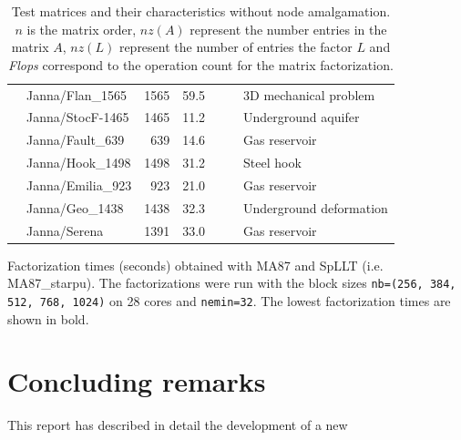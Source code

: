 \documentclass{article}
\begin{document}
\begin{table}[htbp]
\begin{center}
{\begin{tabular}{rl|rrrrl}
         & Janna/Flan\_1565                & 1565     & 59.5     &          &          & 3D mechanical problem    \\
         & Janna/StocF-1465                & 1465     & 11.2     &          &          & Underground aquifer      \\
         & Janna/Fault\_639                & 639      & 14.6     &          &          & Gas reservoir            \\
         & Janna/Hook\_1498                & 1498     & 31.2     &          &          & Steel hook               \\
         & Janna/Emilia\_923               & 923      & 21.0     &          &          & Gas reservoir            \\
         & Janna/Geo\_1438                 & 1438     & 32.3     &          &          & Underground deformation  \\
         & Janna/Serena                    & 1391     & 33.0     &          &          & Gas reservoir            \\
      \hline
    \end{tabular}}
  \end{center}
  \caption{Test matrices and their characteristics without node
    amalgamation. $n$ is the matrix order, $nz(A)$ represent the
    number entries in the matrix $A$, $nz(L)$ represent the number of
    entries the factor $L$ and \textit{Flops} correspond to the operation
    count for the matrix factorization.}
\end{table}


\begin{table}[htbp]
    \begin{center}
      
    \end{center}
    \caption{Factorization times (seconds) obtained with MA87 and
      SpLLT (i.e. MA87\_starpu). The factorizations were run with the
      block sizes \texttt{nb=(256, 384, 512, 768, 1024)} on 28 cores
      and \texttt{nemin=32}. The lowest factorization times are shown
      in bold.}
\end{table}

\section{Concluding remarks}\label{sec:conclusions}
This report has described in detail the development of a new

 
\end{document}
